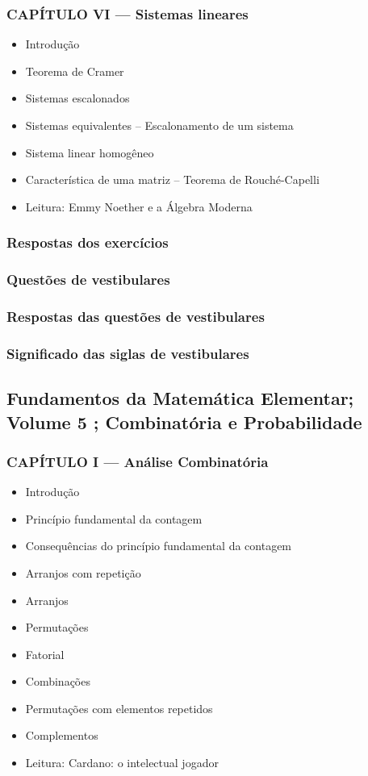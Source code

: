 \documentclass[a4paper,12pt]{article}[abntex2]
\begin{document}
\subsubsection*{CAPÍTULO VI — Sistemas lineares}

\begin{itemize}
\item Introdução
\item Teorema de Cramer
\item Sistemas escalonados
\item Sistemas equivalentes – Escalonamento de um sistema
\item Sistema linear homogêneo
\item Característica de uma matriz – Teorema de Rouché-Capelli
\item Leitura: Emmy Noether e a Álgebra Moderna
\end{itemize}
\subsubsection*{Respostas dos exercícios}

\subsubsection*{Questões de vestibulares}

\subsubsection*{Respostas das questões de vestibulares}

\subsubsection*{Significado das siglas de vestibulares}
 
 \subsection*{Fundamentos da Matemática Elementar; Volume 5 ; Combinatória e Probabilidade}

\subsubsection*{CAPÍTULO I — Análise Combinatória}

\begin{itemize}
\item Introdução
\item Princípio fundamental da contagem
\item Consequências do princípio fundamental da contagem
\item Arranjos com repetição
\item Arranjos
\item Permutações
\item Fatorial
\item Combinações
\item Permutações com elementos repetidos
\item Complementos
\item Leitura: Cardano: o intelectual jogador
\end{itemize}
\end{document}

